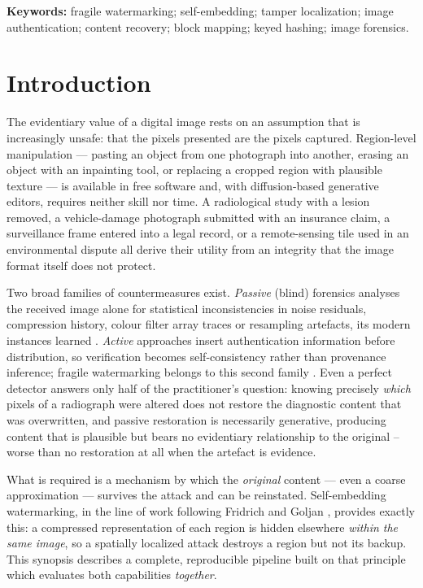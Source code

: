 \documentclass[12pt,a4paper]{article}
\begin{document}
\vspace{0.15in}
\noindent\textbf{Keywords:} fragile watermarking; self-embedding; tamper
localization; image authentication; content recovery; block mapping; keyed
hashing; image forensics.

\newpage
\setcounter{tocdepth}{1}
\tableofcontents

\section{Introduction}

The evidentiary value of a digital image rests on an assumption that is
increasingly unsafe: that the pixels presented are the pixels captured.
Region-level manipulation --- pasting an object from one photograph into another,
erasing an object with an inpainting tool, or replacing a cropped region with
plausible texture --- is available in free software and, with diffusion-based
generative editors, requires neither skill nor time. A radiological study with a
lesion removed, a vehicle-damage photograph submitted with an insurance claim, a
surveillance frame entered into a legal record, or a remote-sensing tile used in
an environmental dispute all derive their utility from an integrity that the
image format itself does not protect.

Two broad families of countermeasures exist. \emph{Passive} (blind) forensics
analyses the received image alone for statistical inconsistencies in noise
residuals, compression history, colour filter array traces or resampling
artefacts, its modern instances learned \cite{zhou2018learning,wu2019mantranet}.
\emph{Active} approaches insert authentication information before
distribution, so verification becomes self-consistency rather than provenance
inference; fragile watermarking belongs to this second family
\cite{wong2001secret,rey2002survey}. Even a perfect detector answers only
half of the practitioner's question: knowing precisely \emph{which} pixels of
a radiograph were altered does not restore the diagnostic content that was
overwritten, and passive restoration is necessarily generative, producing
content that is plausible but bears no evidentiary relationship to the
original -- worse than no restoration at all when the artefact is evidence.

What is required is a mechanism by which the \emph{original} content --- even a
coarse approximation --- survives the attack and can be reinstated.
Self-embedding watermarking, in the line of work following Fridrich and
Goljan \cite{fridrich1999selfembedding}, provides exactly this: a compressed
representation of each region is hidden elsewhere \emph{within the same
image}, so a spatially localized attack destroys a region but not its
backup. This synopsis describes a complete, reproducible pipeline built on
that principle which evaluates both capabilities \emph{together}.
\end{document}
